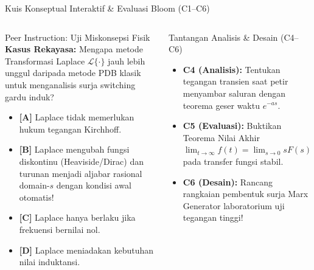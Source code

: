 \documentclass[aspectratio=169,10pt]{beamer}
\begin{document}
\begin{frame}{Kuis Konseptual Interaktif \& Evaluasi Bloom (C1--C6)}
  \begin{columns}[t]
    \begin{alertblock}{Peer Instruction: Uji Miskonsepsi Fisik}
      \footnotesize
      \textbf{Kasus Rekayasa:} Mengapa metode Transformasi Laplace $\mathcal{L}\{\cdot\}$ jauh lebih unggul daripada metode PDB klasik untuk menganalisis surja switching gardu induk?
      \vspace{0.05cm}
      \begin{itemize}\setlength{\itemsep}{1pt}
        \item \textbf{[A]} Laplace tidak memerlukan hukum tegangan Kirchhoff.
        \item \textbf{[B]} Laplace mengubah fungsi diskontinu (Heaviside/Dirac) dan turunan menjadi aljabar rasional domain-$s$ dengan kondisi awal otomatis!
        \item \textbf{[C]} Laplace hanya berlaku jika frekuensi bernilai nol.
        \item \textbf{[D]} Laplace meniadakan kebutuhan nilai induktansi.
      \end{itemize}
    \end{alertblock}

    \begin{block}{Tantangan Analisis \& Desain (C4--C6)}
      \footnotesize
      \begin{itemize}\setlength{\itemsep}{2pt}
        \item \textbf{C4 (Analisis):} Tentukan tegangan transien saat petir menyambar saluran dengan teorema geser waktu $e^{-as}$.
        \item \textbf{C5 (Evaluasi):} Buktikan Teorema Nilai Akhir $\lim_{t \to \infty} f(t) = \lim_{s \to 0} sF(s)$ pada transfer fungsi stabil.
        \item \textbf{C6 (Desain):} Rancang rangkaian pembentuk surja Marx Generator laboratorium uji tegangan tinggi!
      \end{itemize}
    \end{block}
  \end{columns}
\end{frame}
\end{document}
